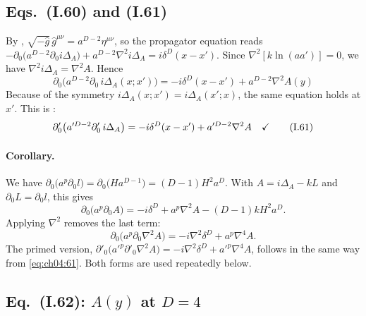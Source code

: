 \subsection{Eqs.~(I.60) and (I.61) \texorpdfstring{\tD}{}}

By , $\sqrt{-\hat g}\,\hat g^{\mu\nu}=a^{D-2}\eta^{\mu\nu}$, so the propagator equation  reads
$-\partial_0\big(a^{D-2}\partial_0 i\Delta_A\big)+a^{D-2}\nabla^2 i\Delta_A=i\delta^D(x-x')$.
Since $\nabla^2[k\ln(aa')]=0$, we have $\nabla^2 i\Delta_A=\nabla^2A$. Hence
\begin{equation*}
\boxed{\;\partial_0\big(a^{D-2}\partial_0\,i\Delta_A(x;x')\big)=-i\delta^D(x-x')+a^{D-2}\nabla^2A(y)\;}
\tag{I.60}\label{eq:ch04:60}
\end{equation*}
Because of the symmetry $i\Delta_A(x;x')=i\Delta_A(x';x)$, the same equation holds at $x'$. This is :
\begin{equation*}
\partial'_0\big(a'^{D-2}\partial'_0\,i\Delta_A\big)=-i\delta^D(x-x')+a'^{D-2}\nabla^2A\quad\checkmark
\tag{I.61}\label{eq:ch04:61}
\end{equation*}

\paragraph{Corollary.}
We have $\partial_0\big(a^p\partial_0 l\big)=\partial_0\big(Ha^{D-1}\big)=(D-1)H^2a^D$.
With $A=i\Delta_A-kL$ and $\partial_0L=\partial_0l$, this gives
\begin{equation}
\partial_0\big(a^p\partial_0A\big)=-i\delta^D+a^p\nabla^2A-(D-1)kH^2a^D .
\end{equation}
Applying $\nabla^2$ removes the last term:
\begin{equation}
\partial_0\big(a^p\partial_0\nabla^2A\big)=-i\nabla^2\delta^D+a^p\nabla^4A .
\label{eq:ch04:corol}
\end{equation}
The primed version, $\partial'_0\big(a'^p\partial'_0\nabla^2A\big)=-i\nabla^2\delta^D+a'^p\nabla^4A$, follows in the same way from \eqref{eq:ch04:61}.
Both forms are used repeatedly below.

\subsection{Eq.~(I.62): \texorpdfstring{$A(y)$}{A(y)} at \texorpdfstring{$D=4$}{D=4} \texorpdfstring{\tD}{}}

